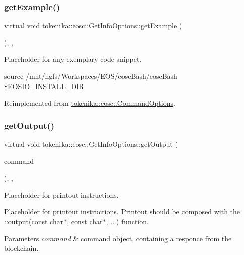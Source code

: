 \subsubsection{\texorpdfstring{get\+Example()}{getExample()}}
{\footnotesize\ttfamily virtual void tokenika\+::eosc\+::\+Get\+Info\+Options\+::get\+Example (\begin{DoxyParamCaption}{ }\end{DoxyParamCaption})\hspace{0.3cm}{\ttfamily [inline]}, {\ttfamily [protected]}, {\ttfamily [virtual]}}



Placeholder for any exemplary code snippet. 

source /mnt/hgfs/\+Workspaces/\+E\+O\+S/eosc\+Bash/eosc\+Bash \$\+E\+O\+S\+I\+O\+\_\+\+I\+N\+S\+T\+A\+L\+L\+\_\+\+D\+IR 

Reimplemented from \hyperlink{classtokenika_1_1eosc_1_1_command_options_ab1fe134b6c2230257a5c07b021812986}{tokenika\+::eosc\+::\+Command\+Options}.

\mbox{\label{classtokenika_1_1eosc_1_1_get_info_options_a73ebf397cd94b45513f1e049cbbb0eb5}} 
\subsubsection{\texorpdfstring{get\+Output()}{getOutput()}}
{\footnotesize\ttfamily virtual void tokenika\+::eosc\+::\+Get\+Info\+Options\+::get\+Output (\begin{DoxyParamCaption}\item[{\hyperlink{classtokenika_1_1eosc_1_1_eosc_command}{tokenika\+::eosc\+::\+Eosc\+Command}}]{command }\end{DoxyParamCaption})\hspace{0.3cm}{\ttfamily [inline]}, {\ttfamily [protected]}, {\ttfamily [virtual]}}



Placeholder for printout instructions. 

Placeholder for printout instructions. Printout should be composed with the \+::output(const char$\ast$, const char$\ast$, ...) function.


\begin{DoxyParams}{Parameters}
{\em command} & command object, containing a responce from the blockchain. \\
\hline
\end{DoxyParams}


